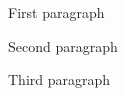 
\noindent       %
First paragraph

\vspace*{0.5em}
\noindent       %
Second paragraph

\vspace*{0.5em}
\noindent       %
Third paragraph